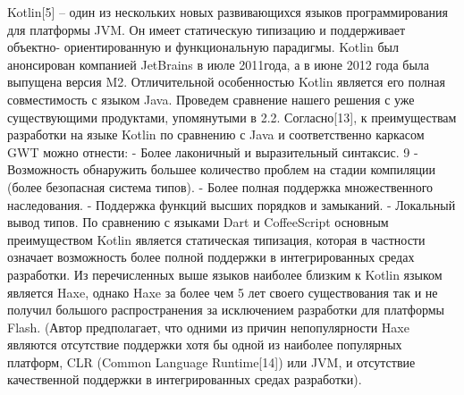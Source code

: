 Kotlin[5] – один из нескольких новых развивающихся языков программирования для
платформы
JVM.
Он
имеет
статическую
типизацию
и
поддерживает
объектно-
ориентированную и функциональную парадигмы. Kotlin был анонсирован компанией
JetBrains в июле 2011года, а в июне 2012 года была выпущена версия M2. Отличительной
особенностью Kotlin является его полная совместимость с языком Java.
Проведем
сравнение
нашего
решения
с
уже
существующими
продуктами,
упомянутыми в 2.2.
Согласно[13], к преимуществам разработки на языке Kotlin по сравнению с Java и
соответственно каркасом GWT можно отнести:
-
Более лаконичный и выразительный синтаксис.
9
-
Возможность обнаружить большее количество проблем на стадии компиляции
(более безопасная система типов).
- Более полная поддержка множественного наследования.
- Поддержка функций высших порядков и замыканий.
- Локальный вывод типов.
По сравнению с языками Dart и CoffeeScript основным преимуществом Kotlin
является статическая типизация, которая в частности означает возможность более полной
поддержки в интегрированных средах разработки.
Из перечисленных выше языков наиболее близким к Kotlin языком является Haxe,
однако Haxe за более чем 5 лет своего существования так и
не получил большого
распространения за исключением разработки для платформы Flash. (Автор предполагает, что
одними из причин непопулярности Haxe являются отсутствие поддержки хотя бы одной из
наиболее популярных платформ, CLR (Common Language Runtime[14]) или JVM, и
отсутствие качественной поддержки в интегрированных средах разработки).
